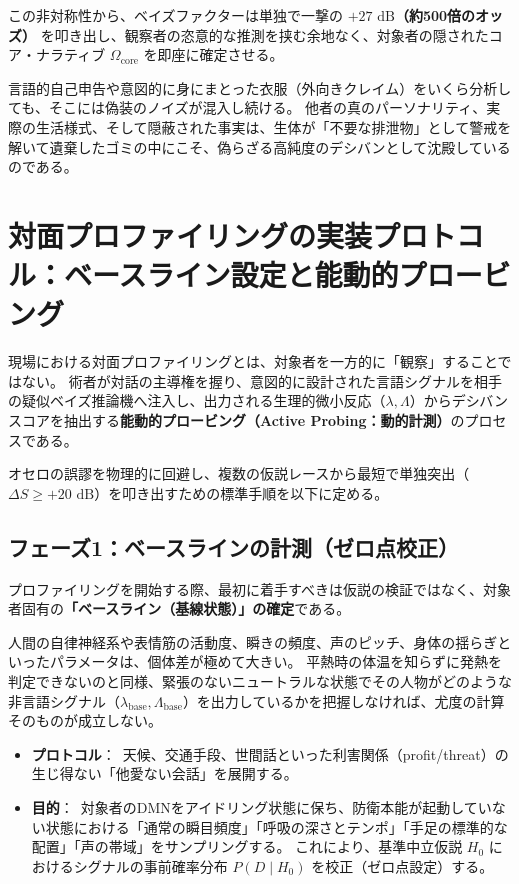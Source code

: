 この非対称性から、ベイズファクターは単独で一撃の \textbf{$+27\text{ dB}$（約500倍のオッズ）} を叩き出し、観察者の恣意的な推測を挟む余地なく、対象者の隠されたコア・ナラティブ $\Omega_{\mathrm{core}}$ を即座に確定させる。

言語的自己申告や意図的に身にまとった衣服（外向きクレイム）をいくら分析しても、そこには偽装のノイズが混入し続ける。
他者の真のパーソナリティ、実際の生活様式、そして隠蔽された事実は、生体が「不要な排泄物」として警戒を解いて遺棄したゴミの中にこそ、偽らざる高純度のデシバンとして沈殿しているのである。

\section{対面プロファイリングの実装プロトコル：ベースライン設定と能動的プロービング}

現場における対面プロファイリングとは、対象者を一方的に「観察」することではない。
術者が対話の主導権を握り、意図的に設計された言語シグナルを相手の疑似ベイズ推論機へ注入し、出力される生理的微小反応（$\lambda, \Lambda$）からデシバンスコアを抽出する\textbf{能動的プロービング（Active Probing：動的計測）}のプロセスである。

オセロの誤謬を物理的に回避し、複数の仮説レースから最短で単独突出（$\Delta S \ge +20\text{ dB}$）を叩き出すための標準手順を以下に定める。

\subsection{フェーズ1：ベースラインの計測（ゼロ点校正）}

プロファイリングを開始する際、最初に着手すべきは仮説の検証ではなく、対象者固有の\textbf{「ベースライン（基線状態）」の確定}である。

人間の自律神経系や表情筋の活動度、瞬きの頻度、声のピッチ、身体の揺らぎといったパラメータは、個体差が極めて大きい。
平熱時の体温を知らずに発熱を判定できないのと同様、緊張のないニュートラルな状態でその人物がどのような非言語シグナル（$\lambda_{\mathrm{base}}, \Lambda_{\mathrm{base}}$）を出力しているかを把握しなければ、尤度の計算そのものが成立しない。

\begin{itemize}
\item \textbf{プロトコル}：\
天候、交通手段、世間話といった利害関係（profit/threat）の生じ得ない「他愛ない会話」を展開する。
\item \textbf{目的}：\
対象者のDMNをアイドリング状態に保ち、防衛本能が起動していない状態における「通常の瞬目頻度」「呼吸の深さとテンポ」「手足の標準的な配置」「声の帯域」をサンプリングする。
これにより、基準中立仮説 $H_0$ におけるシグナルの事前確率分布 $P(D \mid H_0)$ を校正（ゼロ点設定）する。
\end{itemize}

